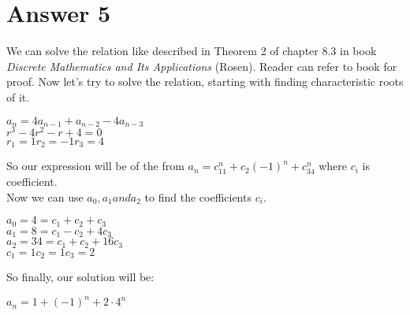 \documentclass[12pt]{article}
\begin{document}
\section*{Answer 5}
We can solve the relation like described in Theorem 2 of chapter 8.3 in book \textit{Discrete Mathematics and Its Applications} (Rosen). Reader can refer to book for proof. Now let's try to solve the relation, starting with finding characteristic roots of it.
\begin{center}
$a_n=4a_{n-1}+a_{n-2}-4a_{n-3}$\\
$r^3-4r^2-r+4=0$\\
$r_1=1$\quad$r_2=-1$\quad$r_3=4$
\end{center}
So our expression will be of the from $a_n=c_11^n+c_2(-1)^n+c_34^n$ where $c_i$ is coefficient.\\
Now we can use $a_0,a_1 and a_2$ to find the coefficients $c_i$.
\begin{center}
$a_0=4=c_1+c_2+c_3$\\
$a_1=8=c_1-c_2+4c_3$\\
$a_2=34=c_1+c_2+16c_3$\\
$c_1=1$\quad $c_2=1$\quad$c_3=2$
\end{center}
So finally, our solution will be:
\begin{center}
$a_n=1+(-1)^n+2\cdot 4^n$
\end{center}
\end{document}
